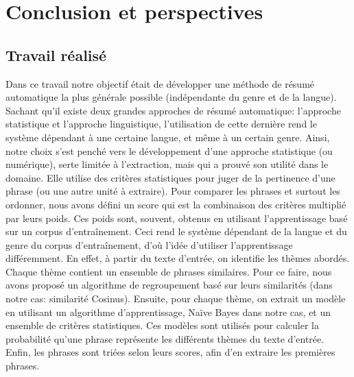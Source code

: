 \documentclass[a4paper,12pt,oneside]{../use/ESIthesis}
\begin{document}
  	 	
  	 	\mainmatter
  \fi

\chapter*{Conclusion et perspectives}
\label{chap:concl}


\section*{Travail réalisé}

Dans ce travail notre objectif était de développer une méthode de résumé automatique la plus générale possible (indépendante du genre et de la langue). 
Sachant qu'il existe deux grandes approches de résumé automatique: l'approche statistique et l'approche linguistique,  l'utilisation de cette dernière rend le système dépendant à une certaine langue, et même à un certain genre.
Ainsi, notre choix s'est penché vers le développement d'une approche statistique (ou numérique), serte limitée à l'extraction, mais qui a prouvé son utilité dans le domaine. 
Elle utilise des critères statistiques pour juger de la pertinence d'une phrase (ou une autre unité à extraire). 
Pour comparer les phrases et surtout les ordonner, nous avons défini un score qui est la combinaison des critères multiplié par leurs poids. 
Ces poids sont, souvent, obtenus en utilisant l'apprentissage basé sur un corpus d'entraînement. 
Ceci rend le système dépendant de la langue et du genre du corpus d'entraînement, d'où l'idée d'utiliser l'apprentissage différemment. 
En effet, à partir du texte d'entrée, on identifie les thèmes abordés.
Chaque thème contient un ensemble de phrases similaires.
Pour ce faire, nous avons proposé un algorithme de regroupement basé sur leurs similarités (dans notre cas: similarité Cosinus). 
Ensuite, pour chaque thème, on extrait un modèle en utilisant un algorithme d'apprentissage, Na\"ive Bayes dans notre cas, et un ensemble de critères statistiques. 
Ces modèles sont utilisés pour calculer la probabilité qu'une phrase représente les différents thèmes du texte d'entrée. 
Enfin, les phrases sont triées selon leurs scores, afin d'en extraire les premières phrases. 
\end{document}
